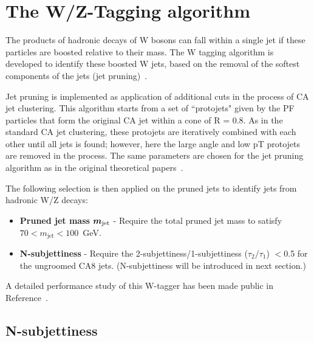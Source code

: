 \section{The W/Z-Tagging algorithm}
\label{sec: W/Z tagging1}

The products of hadronic decays of W bosons can
fall within a single jet if these particles are boosted relative to
their mass.  The W tagging algorithm is developed to
identify these boosted W jets, based on the removal of the softest
components of the jets (jet pruning)~\cite{catop_cms,topwtag_pas}.

 Jet pruning is implemented as application of additional cuts in the process
of CA jet clustering. This algorithm starts from a set of ``protojets" given by the PF particles
that form the original CA jet within a cone of R = 0.8. As in the standard CA jet clustering,
these protojets are iteratively combined with each other until all jets is found; however, here
the large angle and low pT protojets are removed in the process. 
The same parameters are chosen for the jet pruning algorithm
as in the original theoretical papers~\cite{jetpruning1,jetpruning2}.

The following selection is then applied on the pruned jets
to identify jets from hadronic W/Z decays:

\begin{itemize}

\item {\bf Pruned jet mass}  $\mbox{\boldmath$m_{\text{jet}}$}$
  - Require the total pruned jet mass to satisfy $70 < m_\text{jet} < 100$~GeV.

\item {\bf N-subjettiness} 
  - Require the 2-subjettiness/1-subjettiness ($\tau_{2}/\tau_{1}$) $< $0.5 for the ungroomed CA8 jets. (N-subjettiness will be introduced in next section.)
\end{itemize}

A detailed performance study of this W-tagger has been made public in Reference~\cite{JME-13-006}.

\subsection{N-subjettiness}
\label{sec:N-subjettiness1}


